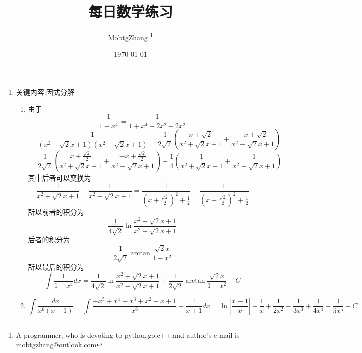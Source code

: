 \documentclass[UTF8,a4paper,10pt]{ctexart}
\title{每日数学练习}
\author{ MobtgZhang \thanks{A programmer, who is devoting to python,go,c++,and author's e-mail is mobtgzhang@outlook.com} }
\date{\today}
\begin{document}
	\maketitle
	\thispagestyle{fancy}
	\begin{flushleft}
		\begin{enumerate}
			\item 关键内容:因式分解\\
			\begin{enumerate}
				\item 由于 
				\begin{equation}
					\frac{1}{1+x^{4}}=\frac{1}{1+x^{4}+2x^{2}-2x^{2}}\nonumber
				\end{equation}
				\begin{equation}
					=\frac{1}{(x^{2}+\sqrt{2}x+1)(x^{2}-\sqrt{2}x+1)}
					=\frac{1}{2\sqrt{2}}(\frac{x+\sqrt{2}}{x^{2}+\sqrt{2}x+1}+\frac{-x+\sqrt{2}}{x^{2}-\sqrt{2}x+1})\nonumber
				\end{equation}
				\begin{equation}
					=\frac{1}{2\sqrt{2}}(\frac{x+\frac{\sqrt{2}}{2}}{x^{2}+\sqrt{2}x+1}+\frac{-x+\frac{\sqrt{2}}{2}}{x^{2}-\sqrt{2}x+1})
					+\frac{1}{4}(\frac{1}{x^{2}+\sqrt{2}x+1}+\frac{1}{x^{2}-\sqrt{2}x+1})\nonumber
				\end{equation}
				其中后者可以变换为
				\begin{equation}
					\frac{1}{x^{2}+\sqrt{2}x+1}+\frac{1}{x^{2}-\sqrt{2}x+1}=\frac{1}{(x+\frac{\sqrt{2}}{2})^{2}+\frac{1}{2}}+\frac{1}{(x-\frac{\sqrt{2}}{2})^{2}+\frac{1}{2}}
				\end{equation}
				所以前者的积分为
				\begin{equation}
					\frac{1}{4\sqrt{2}}\ln{\frac{x^{2}+\sqrt{2}x+1}{x^{2}-\sqrt{2}x+1}}\nonumber
				\end{equation}
				后者的积分为
				\begin{equation}
					\frac{1}{2\sqrt{2}}\arctan{\frac{\sqrt{2}x}{1-x^{2}}}\nonumber
				\end{equation}
				所以最后的积分为
				\begin{equation}
					\int\frac{1}{1+x^{4}}dx=\frac{1}{4\sqrt{2}}\ln{\frac{x^{2}+\sqrt{2}x+1}{x^{2}-\sqrt{2}x+1}}+\frac{1}{2\sqrt{2}}\arctan{\frac{\sqrt{2}x}{1-x^{2}}}+C
				\end{equation}
				\item
				\begin{equation}
					\int\frac{dx}{x^{6}(x+1)}=\int{\frac{-x^{5}+x^{4}-x^{3}+x^{2}-x+1}{x^{6}}+\frac{1}{x+1}}dx
					=\ln{|\frac{x+1}{x}|}-\frac{1}{x}+\frac{1}{2x^{2}}-\frac{1}{3x^{3}}+\frac{1}{4x^{4}}-\frac{1}{5x^{5}}+C\nonumber

\end{equation}
\end{enumerate}
\end{enumerate}
\end{flushleft}
\end{document}
